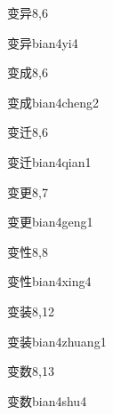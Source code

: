 \begin{entry}{变异}{8,6}
  \begin{phonetics}{变异}{bian4yi4}
  \end{phonetics}
\end{entry}

\begin{entry}{变成}{8,6}
  \begin{phonetics}{变成}{bian4cheng2}
  \end{phonetics}
\end{entry}

\begin{entry}{变迁}{8,6}
  \begin{phonetics}{变迁}{bian4qian1}
  \end{phonetics}
\end{entry}

\begin{entry}{变更}{8,7}
  \begin{phonetics}{变更}{bian4geng1}
  \end{phonetics}
\end{entry}

\begin{entry}{变性}{8,8}
  \begin{phonetics}{变性}{bian4xing4}
  \end{phonetics}
\end{entry}

\begin{entry}{变装}{8,12}
  \begin{phonetics}{变装}{bian4zhuang1}
  \end{phonetics}
\end{entry}

\begin{entry}{变数}{8,13}
  \begin{phonetics}{变数}{bian4shu4}
  \end{phonetics}
\end{entry}

